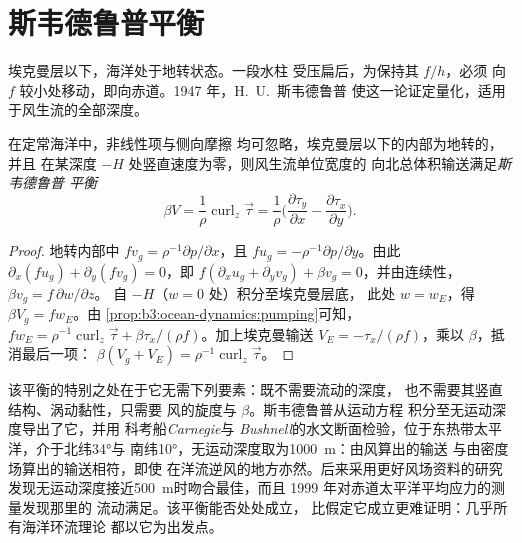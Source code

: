 \section{斯韦德鲁普平衡}\label{sec:b3:ocean-dynamics:sverdrup}

埃克曼层以下，海洋处于地转状态。一段水柱
受压扁后，为保持其 $f/h$，必须
向 $f$ 较小处移动，即向赤道。1947 年，H.~U.~斯韦德鲁普
使这一论证定量化，适用于风生流的全部深度。

\begin{theorem}[斯韦德鲁普平衡]\label{thm:b3:ocean-dynamics:sverdrup}
在定常海洋中，非线性项与侧向摩擦
均可忽略，埃克曼层以下的内部为地转的，并且
在某深度 $-H$ 处竖直速度为零，则风生流单位宽度的
向北总体积输送满足\emph{斯韦德鲁普
平衡}
\[
\beta V = \frac{1}{\rho}\operatorname{curl}_z\vec\tau
= \frac{1}{\rho}\Big(\frac{\partial\tau_y}{\partial x} -
\frac{\partial\tau_x}{\partial y}\Big) .
\]
\end{theorem}

\begin{proof}
地转内部中 $fv_g = \rho^{-1}\partial p/\partial x$，且
$fu_g = -\rho^{-1}\partial p/\partial y$。由此 $\partial_x(fu_g) +
\partial_y(fv_g) = 0$，即 $f(\partial_xu_g + \partial_yv_g) + \beta
v_g = 0$，并由连续性，$\beta v_g = f\,\partial w/\partial z$。
自 $-H$（$w = 0$ 处）积分至埃克曼层底，
此处 $w = w_E$，得 $\beta V_g = fw_E$。由
\cref{prop:b3:ocean-dynamics:pumping}可知，$fw_E = \rho^{-1}\operatorname{curl}_z
\vec\tau + \beta\tau_x/(\rho f)$。加上埃克曼输送 $V_E =
-\tau_x/(\rho f)$，乘以 $\beta$，抵消最后一项：
$\beta(V_g + V_E) = \rho^{-1}\operatorname{curl}_z\vec\tau$。
\end{proof}

该平衡的特别之处在于它无需下列要素：既不需要流动的深度，
也不需要其竖直结构、涡动黏性，只需要
风的旋度与 $\beta$。斯韦德鲁普从运动方程
积分至无运动深度导出了它，并用
科考船\emph{Carnegie}与
\emph{Bushnell}的水文断面检验，位于东热带太平洋，介于北纬\ang{34}与
南纬\ang{10}，无运动深度取为\qty{1000}{m}：由风算出的输送
与由密度场算出的输送相符，即使
在洋流逆风的地方亦然。后来采用更好风场资料的研究
发现无运动深度接近\qty{500}{m}时吻合最佳，而且
1999 年对赤道太平洋平均应力的测量发现那里的
流动满足。该平衡能否处处成立，
比假定它成立更难证明：几乎所有海洋环流理论
都以它为出发点。

